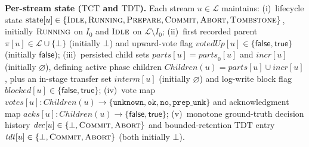 \documentclass[sigconf,nonacm]{acmart}
\newcommand{\stIdle}{\textsc{Idle}}
\newcommand{\stRun}{\textsc{Running}}
\newcommand{\stPrep}{\textsc{Prepare}}
\newcommand{\stCom}{\textsc{Commit}}
\newcommand{\stAbt}{\textsc{Abort}}
\newcommand{\stTomb}{\textsc{Tombstone}}
\newcommand{\Children}{\mathit{Children}}
\newcommand{\parts}{\mathit{parts}}
\newcommand{\incr}{\mathit{incr}}
\newcommand{\interm}{\mathit{interm}}
\newcommand{\tdt}{\mathit{tdt}}
\newcommand{\dec}{\mathit{dec}}
\newcommand{\blocked}{\mathit{blocked}}
\begin{document}
\textbf{Per-stream state (\(\mathrm{TCT}\) and \(\mathrm{TDT}\)).} Each
stream \(u \in \mathcal{L}\) maintains:
(i)~lifecycle state \(\mathrm{state}[u] \in \{\stIdle,\allowbreak \stRun,\allowbreak
\stPrep,\allowbreak \stCom,\allowbreak \stAbt,\allowbreak \stTomb\}\),
initially \(\stRun\) on \(I_0\) and \(\stIdle\) on \(\mathcal{L} \setminus I_0\);
(ii)~first recorded parent \(\pi[u] \in \mathcal{L} \cup \{\bot\}\)
(initially \(\bot\)) and upward-vote flag \(\mathit{votedUp}[u] \in
\{\mathsf{false},\allowbreak \mathsf{true}\}\) (initially \(\mathsf{false}\));
(iii)~persisted child sets \(\parts[u] = \parts_0[u]\) and \(\incr[u]\)
(initially \(\varnothing\)), defining active phase children
\(\Children(u) = \parts[u] \cup \incr[u]\), plus an in-stage transfer set
\(\interm[u]\) (initially \(\varnothing\)) and log-write block flag
\(\blocked[u] \in \{\mathsf{false},\allowbreak \mathsf{true}\}\);
(iv)~vote map \(\mathit{votes}[u] : \Children(u) \to \{\mathtt{unknown},\allowbreak
\mathtt{ok},\allowbreak \mathtt{no},\allowbreak \mathtt{prep\_unk}\}\) and
acknowledgment map \(\mathit{acks}[u] : \Children(u) \to
\{\mathsf{false},\allowbreak \mathsf{true}\}\);
(v)~monotone ground-truth decision history \(\dec[u] \in \{\bot,\allowbreak
\stCom,\allowbreak \stAbt\}\) and bounded-retention \(\mathrm{TDT}\) entry
\(\tdt[u] \in \{\bot,\allowbreak \stCom,\allowbreak \stAbt\}\) (both
initially \(\bot\)).
\end{document}
